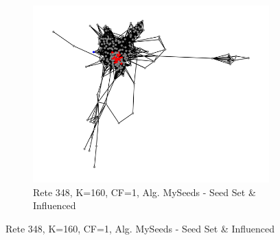 \begin{figure}[h]
\begin{subfigure}[b]{0.3\textwidth}
    \includegraphics[width=\textwidth]{images/rete348_alg3_k160_cf1/influencing_and_influenced.png}
    \caption{Rete 348, K=160, CF=1, Alg. MySeeds - Seed Set \& Influenced}
    \label{fig:sub2}
  \end{subfigure}
\end{figure}

\newpage